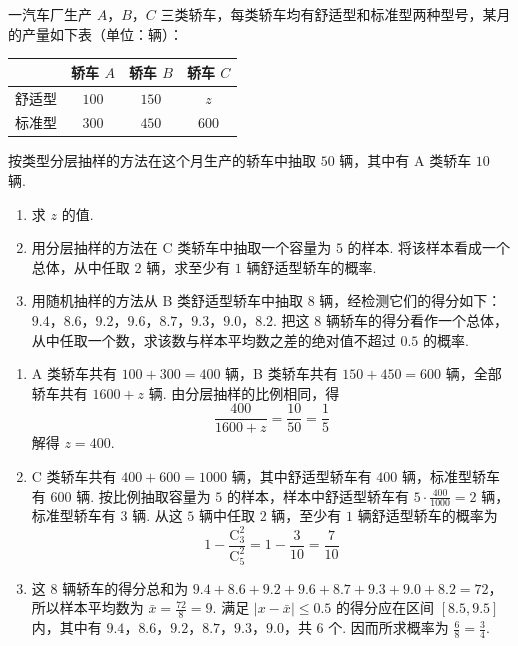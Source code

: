 \begin{problem}
一汽车厂生产 \(A\)，\(B\)，\(C\) 三类轿车，每类轿车均有舒适型和标准型两种型号，某月的产量如下表（单位：辆）：

\begin{center}
\begin{tabular}{|c|c|c|c|}
\hline
& 轿车 \(A\) & 轿车 \(B\) & 轿车 \(C\) \\
\hline
舒适型 & \(100\) & \(150\) & \(z\) \\
\hline
标准型 & \(300\) & \(450\) & \(600\) \\
\hline
\end{tabular}
\end{center}

按类型分层抽样的方法在这个月生产的轿车中抽取 \(50\) 辆，其中有 A 类轿车 \(10\) 辆.

\begin{enumerate}
\item 求 \(z\) 的值.
\item 用分层抽样的方法在 C 类轿车中抽取一个容量为 \(5\) 的样本. 将该样本看成一个总体，从中任取 \(2\) 辆，求至少有 \(1\) 辆舒适型轿车的概率.
\item 用随机抽样的方法从 B 类舒适型轿车中抽取 \(8\) 辆，经检测它们的得分如下：\(9.4\)，\(8.6\)，\(9.2\)，\(9.6\)，\(8.7\)，\(9.3\)，\(9.0\)，\(8.2\). 把这 \(8\) 辆轿车的得分看作一个总体，从中任取一个数，求该数与样本平均数之差的绝对值不超过 \(0.5\) 的概率.
\end{enumerate}
\end{problem}

\begin{solution}
\begin{enumerate}
\item A 类轿车共有 \(100+300=400\) 辆，B 类轿车共有 \(150+450=600\) 辆，全部轿车共有 \(1600+z\) 辆. 由分层抽样的比例相同，得
\[
\frac{400}{1600+z}=\frac{10}{50}=\frac{1}{5}
\]
解得 \(z=400\).

\item C 类轿车共有 \(400+600=1000\) 辆，其中舒适型轿车有 \(400\) 辆，标准型轿车有 \(600\) 辆. 按比例抽取容量为 \(5\) 的样本，样本中舒适型轿车有 \(5\cdot\frac{400}{1000}=2\) 辆，标准型轿车有 \(3\) 辆. 从这 \(5\) 辆中任取 \(2\) 辆，至少有 \(1\) 辆舒适型轿车的概率为
\[
1-\frac{\mathrm C_{3}^{2}}{\mathrm C_{5}^{2}}=1-\frac{3}{10}=\frac{7}{10}
\]

\item 这 \(8\) 辆轿车的得分总和为 \(9.4+8.6+9.2+9.6+8.7+9.3+9.0+8.2=72\)，所以样本平均数为 \(\bar x=\frac{72}{8}=9\). 满足 \(\lvert x-\bar x\rvert\leqslant0.5\) 的得分应在区间 \([8.5,9.5]\) 内，其中有 \(9.4\)，\(8.6\)，\(9.2\)，\(8.7\)，\(9.3\)，\(9.0\)，共 \(6\) 个. 因而所求概率为 \(\frac{6}{8}=\frac{3}{4}\).
\end{enumerate}
\end{solution}

